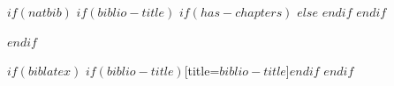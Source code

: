 \documentclass[$if(font_size)$$font_size$$else$12pt$endif$]{book}
\begin{document}

\begin{frame}
$if(natbib)$
$if(biblio-title)$
$if(has-chapters)$
\renewcommand\refname{$biblio-title$} %
$else$
\renewcommand\refname{$biblio-title$} %
$endif$
$endif$

$endif$

$if(biblatex)$
\printbibliography$if(biblio-title)$[title=$biblio-title$]$endif$
$endif$
\end{frame}
\end{document}
